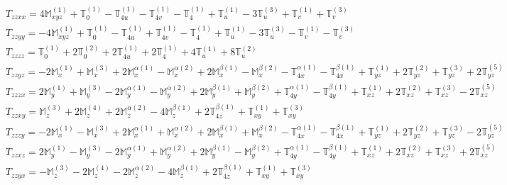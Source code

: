 \documentclass[fleqn,8pt,landscape]{jsarticle}
\begin{document}
\begin{align*}
& T_{zzxx} = 4 \mathbb{M}_{xyz}^{(1)} + \mathbb{T}_{0}^{(1)} - \mathbb{T}_{4u}^{(1)} - \mathbb{T}_{4v}^{(1)} - \mathbb{T}_{4}^{(1)} + \mathbb{T}_{u}^{(1)} - 3 \mathbb{T}_{u}^{(3)} + \mathbb{T}_{v}^{(1)} + \mathbb{T}_{v}^{(3)} \\
& T_{zzyy} = - 4 \mathbb{M}_{xyz}^{(1)} + \mathbb{T}_{0}^{(1)} - \mathbb{T}_{4u}^{(1)} + \mathbb{T}_{4v}^{(1)} - \mathbb{T}_{4}^{(1)} + \mathbb{T}_{u}^{(1)} - 3 \mathbb{T}_{u}^{(3)} - \mathbb{T}_{v}^{(1)} - \mathbb{T}_{v}^{(3)} \\
& T_{zzzz} = \mathbb{T}_{0}^{(1)} + 2 \mathbb{T}_{0}^{(2)} + 2 \mathbb{T}_{4u}^{(1)} + 2 \mathbb{T}_{4}^{(1)} + 4 \mathbb{T}_{u}^{(1)} + 8 \mathbb{T}_{u}^{(2)} \\
& T_{zzyz} = - 2 \mathbb{M}_{x}^{(1)} + \mathbb{M}_{x}^{(3)} + 2 \mathbb{M}_{x}^{\alpha(1)} - \mathbb{M}_{x}^{\alpha(2)} + 2 \mathbb{M}_{x}^{\beta(1)} - \mathbb{M}_{x}^{\beta(2)} - \mathbb{T}_{4x}^{\alpha(1)} - \mathbb{T}_{4x}^{\beta(1)} + \mathbb{T}_{yz}^{(1)} + 2 \mathbb{T}_{yz}^{(2)} + \mathbb{T}_{yz}^{(3)} + 2 \mathbb{T}_{yz}^{(5)} \\
& T_{zzzx} = 2 \mathbb{M}_{y}^{(1)} + \mathbb{M}_{y}^{(3)} - 2 \mathbb{M}_{y}^{\alpha(1)} - \mathbb{M}_{y}^{\alpha(2)} + 2 \mathbb{M}_{y}^{\beta(1)} + \mathbb{M}_{y}^{\beta(2)} + \mathbb{T}_{4y}^{\alpha(1)} - \mathbb{T}_{4y}^{\beta(1)} + \mathbb{T}_{xz}^{(1)} + 2 \mathbb{T}_{xz}^{(2)} + \mathbb{T}_{xz}^{(3)} - 2 \mathbb{T}_{xz}^{(5)} \\
& T_{zzxy} = \mathbb{M}_{z}^{(3)} + 2 \mathbb{M}_{z}^{(4)} + 2 \mathbb{M}_{z}^{\alpha(2)} - 4 \mathbb{M}_{z}^{\beta(1)} + 2 \mathbb{T}_{4z}^{\beta(1)} + \mathbb{T}_{xy}^{(1)} + \mathbb{T}_{xy}^{(3)} \\
& T_{zzzy} = - 2 \mathbb{M}_{x}^{(1)} - \mathbb{M}_{x}^{(3)} + 2 \mathbb{M}_{x}^{\alpha(1)} + \mathbb{M}_{x}^{\alpha(2)} + 2 \mathbb{M}_{x}^{\beta(1)} + \mathbb{M}_{x}^{\beta(2)} - \mathbb{T}_{4x}^{\alpha(1)} - \mathbb{T}_{4x}^{\beta(1)} + \mathbb{T}_{yz}^{(1)} + 2 \mathbb{T}_{yz}^{(2)} + \mathbb{T}_{yz}^{(3)} - 2 \mathbb{T}_{yz}^{(5)} \\
& T_{zzxz} = 2 \mathbb{M}_{y}^{(1)} - \mathbb{M}_{y}^{(3)} - 2 \mathbb{M}_{y}^{\alpha(1)} + \mathbb{M}_{y}^{\alpha(2)} + 2 \mathbb{M}_{y}^{\beta(1)} - \mathbb{M}_{y}^{\beta(2)} + \mathbb{T}_{4y}^{\alpha(1)} - \mathbb{T}_{4y}^{\beta(1)} + \mathbb{T}_{xz}^{(1)} + 2 \mathbb{T}_{xz}^{(2)} + \mathbb{T}_{xz}^{(3)} + 2 \mathbb{T}_{xz}^{(5)} \\
& T_{zzyx} = - \mathbb{M}_{z}^{(3)} - 2 \mathbb{M}_{z}^{(4)} - 2 \mathbb{M}_{z}^{\alpha(2)} - 4 \mathbb{M}_{z}^{\beta(1)} + 2 \mathbb{T}_{4z}^{\beta(1)} + \mathbb{T}_{xy}^{(1)} + \mathbb{T}_{xy}^{(3)} \\

\end{align*}
\end{document}

